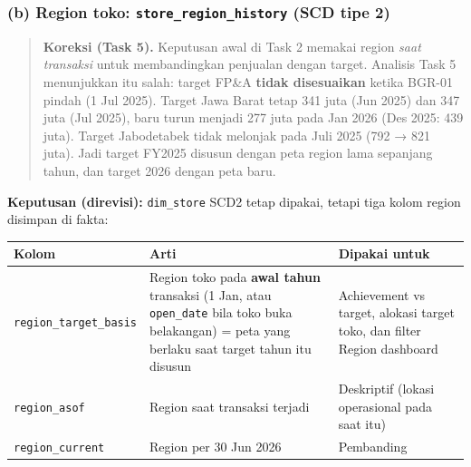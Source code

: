 \documentclass[10pt,a4paper]{article}
\begin{document}
\subsubsection{\texorpdfstring{(b) Region toko: \texttt{store\_\allowbreak{}region\_\allowbreak{}history} (SCD tipe 2)}{(b) Region toko: store\_\allowbreak{}region\_\allowbreak{}history (SCD tipe 2)}}\label{b-region-toko-store_region_history-scd-tipe-2}

\begin{quote}
\textbf{Koreksi (Task 5).} Keputusan awal di Task 2 memakai region \emph{saat transaksi} untuk membandingkan penjualan dengan target. Analisis Task 5
menunjukkan itu salah: target FP\&A \textbf{tidak disesuaikan} ketika BGR-01 pindah (1 Jul 2025). Target Jawa Barat tetap 341 juta (Jun 2025) dan 347
juta (Jul 2025), baru turun menjadi 277 juta pada Jan 2026 (Des 2025: 439 juta). Target Jabodetabek tidak melonjak pada Juli 2025 (792 → 821 juta).
Jadi target FY2025 disusun dengan peta region lama sepanjang tahun, dan target 2026 dengan peta baru.
\end{quote}

\textbf{Keputusan (direvisi):} \texttt{dim\_\allowbreak{}store} SCD2 tetap dipakai, tetapi tiga kolom region disimpan di fakta:

{\def\LTcaptype{none} %
\begin{longtable}[]{@{}
  >{\raggedright\arraybackslash}p{}
  >{\raggedright\arraybackslash}p{}
  >{\raggedright\arraybackslash}p{}@{}}
\toprule\noalign{}
\begin{minipage}[b]{\linewidth}\raggedright
Kolom
\end{minipage} & \begin{minipage}[b]{\linewidth}\raggedright
Arti
\end{minipage} & \begin{minipage}[b]{\linewidth}\raggedright
Dipakai untuk
\end{minipage} \\
\midrule\noalign{}
\endhead
\bottomrule\noalign{}
\endlastfoot
\texttt{region\_\allowbreak{}target\_\allowbreak{}basis} & Region toko pada \textbf{awal tahun} transaksi (1 Jan, atau \texttt{open\_\allowbreak{}date} bila toko buka belakangan) = peta yang berlaku saat target tahun itu disusun & Achievement vs target, alokasi target toko, dan filter Region dashboard \\
\texttt{region\_\allowbreak{}asof} & Region saat transaksi terjadi & Deskriptif (lokasi operasional pada saat itu) \\
\texttt{region\_\allowbreak{}current} & Region per 30 Jun 2026 & Pembanding \\
\end{longtable}
}
\end{document}
